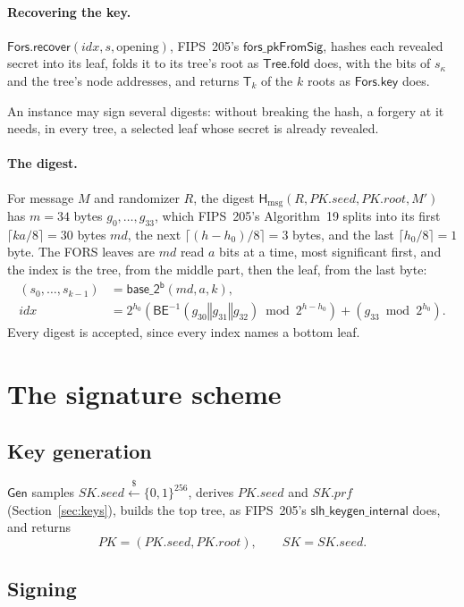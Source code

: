 \documentclass[11pt]{article}
\newcommand{\bits}[1]{\{0,1\}^{#1}}
\newcommand{\getsr}{\stackrel{\$}{\gets}}
\newcommand{\Hmsg}{\mathsf{H}_{\mathrm{msg}}}
\newcommand{\Gen}{\mathsf{Gen}}
\newcommand{\BE}{\mathsf{BE}}
\newcommand{\basetwo}{\mathsf{base\_2^b}}
\newcommand{\concat}{\mathbin\Vert}
\newcommand{\PK}{\mathit{PK}}
\newcommand{\SK}{\mathit{SK}}
\newcommand{\pkseed}{\mathit{PK.seed}}
\newcommand{\pkroot}{\mathit{PK.root}}
\newcommand{\skseed}{\mathit{SK.seed}}
\newcommand{\skprf}{\mathit{SK.prf}}
\newcommand{\idx}{\mathit{idx}}
\newcommand{\TreeFold}{\mathsf{Tree.fold}}
\newcommand{\ForsKey}{\mathsf{Fors.key}}
\newcommand{\ForsRec}{\mathsf{Fors.recover}}
\begin{document}
\paragraph{Recovering the key.}
$\ForsRec(\idx,s,\text{opening})$, FIPS~205's $\mathsf{fors\_pkFromSig}$, hashes each revealed secret into its leaf, folds it to its tree's root as $\TreeFold$ does, with the bits of $s_\kappa$ and the tree's node addresses, and returns $\mathsf T_k$ of the $k$ roots as $\ForsKey$ does.

An instance may sign several digests: without breaking the hash, a forgery at it needs, in every tree, a selected leaf whose secret is already revealed.

\paragraph{The digest.}
For message $M$ and randomizer $R$, the digest $\Hmsg(R,\pkseed,\pkroot,M')$ has $m=34$ bytes $g_0,\ldots,g_{33}$, which FIPS~205's Algorithm~19 splits into its first $\lceil ka/8\rceil=30$ bytes $\mathit{md}$, the next $\lceil(h-h_0)/8\rceil=3$ bytes, and the last $\lceil h_0/8\rceil=1$ byte. The FORS leaves are $\mathit{md}$ read $a$ bits at a time, most significant first, and the index is the tree, from the middle part, then the leaf, from the last byte:
\[
\begin{aligned}
  (s_0,\ldots,s_{k-1})&=\basetwo(\mathit{md},a,k),\\
  \idx&=2^{h_0}\left(\BE^{-1}(g_{30}\concat g_{31}\concat g_{32})\bmod2^{h-h_0}\right)+\left(g_{33}\bmod2^{h_0}\right).
\end{aligned}
\]
Every digest is accepted, since every index names a bottom leaf.

\section{The signature scheme}
\label{sec:scheme}

\subsection{Key generation}

$\Gen$ samples $\skseed\getsr\bits{256}$, derives $\pkseed$ and $\skprf$ (Section~\ref{sec:keys}), builds the top tree, as FIPS~205's $\mathsf{slh\_keygen\_internal}$ does, and returns
\[
  \PK=(\pkseed,\pkroot),\qquad \SK=\skseed.
\]

\subsection{Signing}
\end{document}
